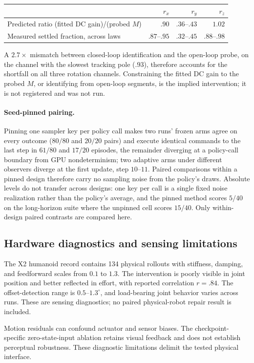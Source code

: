 \begin{center}\small
\begin{tabular}{lrrr}
\toprule
 & $r_x$ & $r_y$ & $r_z$\\
\midrule
Predicted ratio (fitted DC gain)/(probed $M$) & $.90$ & $.36$--$.43$ & $1.02$\\
Measured settled fraction, across laws & $.87$--$.95$ & $.32$--$.45$ & $.88$--$.98$\\
\bottomrule
\end{tabular}
\end{center}
A $2.7\times$ mismatch between closed-loop identification and the open-loop
probe, on the channel with the slowest tracking pole ($.93$), therefore
accounts for the shortfall on all three rotation channels. Constraining the
fitted DC gain to the probed $M$, or identifying from open-loop segments, is
the implied intervention; it is not registered and was not run.

\paragraph{Seed-pinned pairing.}
Pinning one sampler key per policy call makes two runs' frozen arms agree on
every outcome ($80/80$ and $20/20$ pairs) and execute identical commands to
the last step in $61/80$ and $17/20$ episodes, the remainder diverging at a
policy-call boundary from GPU nondeterminism; two adaptive arms under
different observers diverge at the first update, step $10$--$11$. Paired
comparisons within a pinned design therefore carry no sampling noise from
the policy's draws. Absolute levels do not transfer across designs: one key
per call is a single fixed noise realization rather than the policy's
average, and the pinned method scores $5/40$ on the long-horizon suite where
the unpinned cell scores $15/40$. Only within-design paired contrasts are
compared here.

\subsection{Hardware diagnostics and sensing limitations}

The X2 humanoid record contains 134 physical rollouts with stiffness, damping, and
feedforward scales from $0.1$ to $1.3$. The intervention is poorly visible in joint
position and better reflected in effort, with reported correlation $r=.84$.
The offset-detection range is $0.5$--$1.3^\circ$, and load-bearing joint behavior
varies across runs. These are sensing diagnostics; no paired physical-robot repair
result is included.

Motion residuals can confound actuator and sensor biases. The checkpoint-specific
zero-state-input ablation retains visual feedback and does not establish perceptual
robustness. These diagnostic limitations delimit the tested physical interface.
